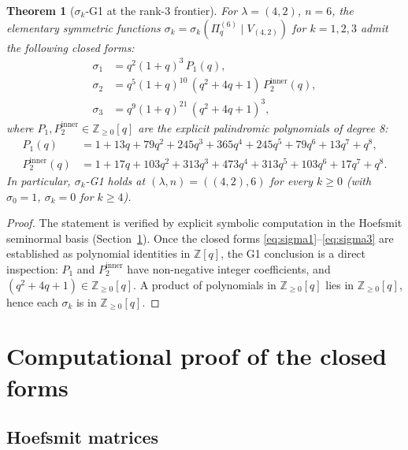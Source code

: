 \documentclass[11pt]{article}
\theoremstyle{plain}
\newtheorem{theorem}{Theorem}
\theoremstyle{definition}
\theoremstyle{remark}
\newcommand{\Z}{\mathbb{Z}}
\newcommand{\Pibs}{\Pi_q}
\begin{document}
\begin{theorem}[$\sigma_k$-G1 at the rank-3 frontier]\label{thm:main}
For $\lambda = (4,2)$, $n = 6$, the elementary symmetric functions
$\sigma_k = \sigma_k(\Pibs^{(6)} \mid V_{(4,2)})$ for $k = 1, 2, 3$ admit
the following closed forms:
\begin{align}
\sigma_1 &= q^{2}(1+q)^{3}\, P_1(q), \label{eq:sigma1}\\
\sigma_2 &= q^{5}(1+q)^{10}\, (q^2+4q+1)\, P_2^{\mathrm{inner}}(q),\label{eq:sigma2}\\
\sigma_3 &= q^{9}(1+q)^{21}\, (q^2+4q+1)^{3},\label{eq:sigma3}
\end{align}
where $P_1, P_2^{\mathrm{inner}} \in \Z_{\geq 0}[q]$ are the explicit
palindromic polynomials of degree 8:
\begin{align*}
P_1(q) &= 1 + 13q + 79q^2 + 245q^3 + 365q^4 + 245q^5 + 79q^6 + 13q^7 + q^8,\\
P_2^{\mathrm{inner}}(q) &= 1 + 17q + 103q^2 + 313q^3 + 473q^4 + 313q^5 + 103q^6 + 17q^7 + q^8.
\end{align*}
In particular, $\sigma_k$-G1 holds at $(\lambda, n) = ((4,2), 6)$ for every
$k \geq 0$ (with $\sigma_0 = 1$, $\sigma_k = 0$ for $k \geq 4$).
\end{theorem}

\begin{proof}
The statement is verified by explicit symbolic computation in the Hoefsmit
seminormal basis (Section~\ref{sec:computation}). Once the closed forms
\eqref{eq:sigma1}--\eqref{eq:sigma3} are established as polynomial identities
in $\Z[q]$, the G1 conclusion is a direct inspection: $P_1$ and
$P_2^{\mathrm{inner}}$ have non-negative integer coefficients, and
$(q^2+4q+1) \in \Z_{\geq 0}[q]$. A product of polynomials in $\Z_{\geq 0}[q]$
lies in $\Z_{\geq 0}[q]$, hence each $\sigma_k$ is in $\Z_{\geq 0}[q]$.
\end{proof}

\section{Computational proof of the closed forms}\label{sec:computation}

\subsection{Hoefsmit matrices}
\end{document}

